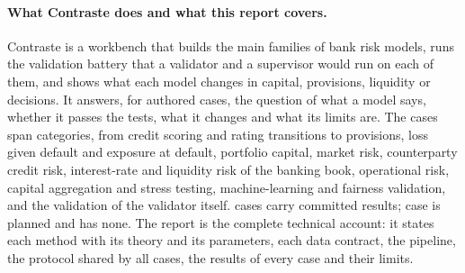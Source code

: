 \paragraph{What Contraste does and what this report covers.} Contraste is a workbench that builds the main families of bank risk models, runs the validation
battery that a validator and a supervisor would run on each of them, and shows what each model changes in capital, provisions, liquidity or decisions. It
answers, for \rsCases{} authored cases, the question of what a model says, whether it passes the tests, what it changes and what its limits are. The cases span
\rsCategories{} categories, from credit scoring and rating transitions to provisions, loss given default and exposure at default, portfolio capital, market risk,
counterparty credit risk, interest-rate and liquidity risk of the banking book, operational risk, capital aggregation and stress testing, machine-learning and
fairness validation, and the validation of the validator itself. \rsCasesResult{} cases carry committed results; case \rsCaseNoResult{} is planned and has none. The report is the complete technical account:
it states each method with its theory and its parameters, each data contract, the pipeline, the protocol shared by all cases, the results of every case and their
limits.

